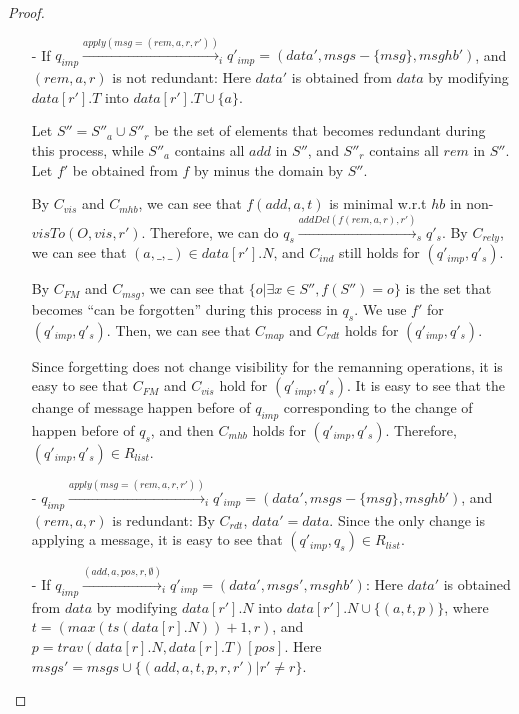 \begin {proof}
\begin{itemize}
\item[-] If $q_{\mathit{imp}} \xrightarrow{\mathit{apply}( \mathit{msg}=( \mathit{rem},a,r,r' ))}_i q'_{\mathit{imp}} = (\mathit{data}',\mathit{msgs} - \{ \mathit{msg} \},\mathit{msghb}')$, and $(\mathit{rem},a,r)$ is not redundant: Here $\mathit{data}'$ is obtained from $\mathit{data}$ by modifying $\mathit{data}[r'].T$ into $\mathit{data}[r'].T \cup \{ a \}$. 

    Let $S'' = S''_a \cup S''_r$ be the set of elements that becomes redundant during this process, while $S''_a$ contains all $\mathit{add}$ in $S''$, and $S''_r$ contains all $\mathit{rem}$ in $S''$. Let $f'$ be obtained from $f$ by minus the domain by $S''$. 
    
    By $C_{\mathit{vis}}$ and $C_{\mathit{mhb}}$, we can see that $f(\mathit{add},a,t)$ is minimal w.r.t $\mathit{hb}$ in non-$\mathit{visTo}(O,\mathit{vis},r')$. Therefore, we can do $q_s \xrightarrow{ \mathit{addDel}( f(\mathit{rem},a,r),r' )}_s q'_s$. By $C_{\mathit{rely}}$, we can see that $(a,\_,\_) \in \mathit{data}[r'].N$, and $C_{\mathit{ind}}$ still holds for $(q'_{\mathit{imp}},q'_s)$. 
    
    By $C_{\mathit{FM}}$ and $C_{\mathit{msg}}$, we can see that $\{ o \vert \exists x \in S'', f(S'') = o \}$ is the set that becomes ``can be forgotten'' during this process in $q_s$. We use $f'$ for $(q'_{\mathit{imp}},q'_s)$. Then, we can see that $C_{\mathit{map}}$ and $C_{\mathit{rdt}}$ holds for $(q'_{\mathit{imp}},q'_s)$. 

    Since forgetting does not change visibility for the remanning operations, it is easy to see that $C_{\mathit{FM}}$ and $C_{\mathit{vis}}$ hold for $(q'_{\mathit{imp}},q'_s)$. It is easy to see that the change of message happen before of $q_{\mathit{imp}}$ corresponding to the change of happen before of $q_s$, and then $C_{\mathit{mhb}}$ holds for $(q'_{\mathit{imp}},q'_s)$. Therefore, $(q'_{\mathit{imp}},q'_s) \in R_{\mathit{list}}$.

\item[-] $q_{\mathit{imp}} \xrightarrow{\mathit{apply}( \mathit{msg}=( \mathit{rem},a,r,r' ))}_i q'_{\mathit{imp}} = (\mathit{data}',\mathit{msgs} - \{ \mathit{msg} \},\mathit{msghb}')$, and $(\mathit{rem},a,r)$ is redundant: By $C_{\mathit{rdt}}$, $\mathit{data}' = \mathit{data}$. Since the only change is applying a message, it is easy to see that $(q'_{\mathit{imp}},q_s) \in R_{\mathit{list}}$. 

\item[-] If $q_{\mathit{imp}} \xrightarrow{(\mathit{add},a,\mathit{pos},r,\emptyset)}_i q'_{\mathit{imp}} = (\mathit{data}',\mathit{msgs}',\mathit{msghb}')$: Here $\mathit{data}'$ is obtained from $\mathit{data}$ by modifying $\mathit{data}[r'].N$ into $\mathit{data}[r'].N \cup \{ (a,t,p) \}$, where $t=(\mathit{max}(\mathit{ts}(\mathit{data}[r].N))+1,r)$, and $p = \mathit{trav}(\mathit{data}[r].N,\mathit{data}[r].T)[\mathit{pos}]$. Here $\mathit{msgs}' = \mathit{msgs} \cup \{ (\mathit{add},a,t,p,r,r') \vert r' \neq r \}$. 
    

\end{itemize}
\end{proof}
